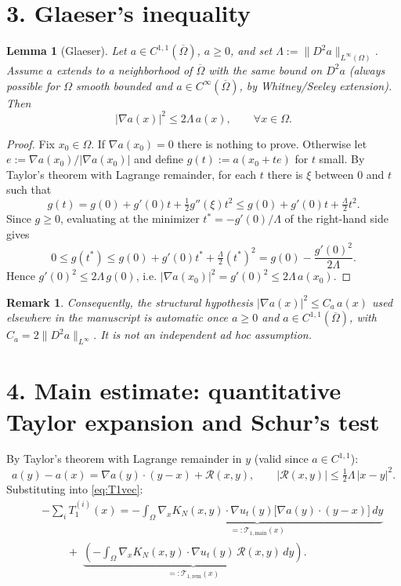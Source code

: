 \documentclass[11pt,letterpaper]{amsart}
\newtheorem{lemma}[theorem]{Lemma}
\newtheorem{remark}[theorem]{Remark}
\begin{document}
\section*{3. Glaeser's inequality}

\begin{lemma}[Glaeser]\label{lem:glaeser}
Let $a \in C^{1,1}(\overline\Omega)$, $a \ge 0$, and set $\Lambda := \|D^2a\|_{L^\infty(\Omega)}$. Assume $a$ extends to a neighborhood of $\overline\Omega$ with the same bound on $D^2a$ (always possible for $\Omega$ smooth bounded and $a \in C^\infty(\overline\Omega)$, by Whitney/Seeley extension). Then
\[
|\nabla a(x)|^2 \le 2\Lambda\,a(x), \qquad \forall x \in \Omega.
\]
\end{lemma}

\begin{proof}
Fix $x_0 \in \Omega$. If $\nabla a(x_0) = 0$ there is nothing to prove. Otherwise let $e := \nabla a(x_0)/|\nabla a(x_0)|$ and define $g(t) := a(x_0+te)$ for $t$ small. By Taylor's theorem with Lagrange remainder, for each $t$ there is $\xi$ between $0$ and $t$ such that
\[
g(t) = g(0) + g'(0)t + \tfrac12 g''(\xi)t^2 \le g(0) + g'(0)t + \tfrac{\Lambda}{2}t^2.
\]
Since $g \ge 0$, evaluating at the minimizer $t^* = -g'(0)/\Lambda$ of the right-hand side gives
\[
0 \le g(t^*) \le g(0) + g'(0)t^* + \tfrac{\Lambda}{2}(t^*)^2 = g(0) - \frac{g'(0)^2}{2\Lambda}.
\]
Hence $g'(0)^2 \le 2\Lambda\,g(0)$, i.e. $|\nabla a(x_0)|^2 = g'(0)^2 \le 2\Lambda\,a(x_0)$.
\end{proof}

\begin{remark}
Consequently, the structural hypothesis $|\nabla a(x)|^2 \le C_a\,a(x)$ used elsewhere in the manuscript is \emph{automatic} once $a \ge 0$ and $a \in C^{1,1}(\overline\Omega)$, with $C_a = 2\|D^2a\|_{L^\infty}$. It is not an independent ad hoc assumption.
\end{remark}

\section*{4. Main estimate: quantitative Taylor expansion and Schur's test}

By Taylor's theorem with Lagrange remainder in $y$ (valid since $a \in C^{1,1}$):
\begin{equation}\label{eq:taylor-quant}
a(y) - a(x) = \nabla a(y)\cdot(y-x) + \mathcal{R}(x,y), \qquad |\mathcal{R}(x,y)| \le \tfrac{1}{2}\Lambda\,|x-y|^2.
\end{equation}
Substituting into \eqref{eq:T1vec}:
\begin{eqnarray*}
&&-\sum_i T_1^{(i)}(x) = \underbrace{-\int_\Omega \nabla_x K_N(x,y)\cdot\nabla u_t(y)\big[\nabla a(y)\cdot(y-x)\big]\,dy}_{=:\mathcal{T}_{1,\mathrm{main}}(x)}\\
&&\qquad\;+\;
\underbrace{\left(-\int_\Omega \nabla_x K_N(x,y)\cdot\nabla u_t(y)\,\mathcal{R}(x,y)\,dy\right)}_{=:\mathcal{T}_{1,\mathrm{rem}}(x)}.
\end{eqnarray*}
\end{document}
